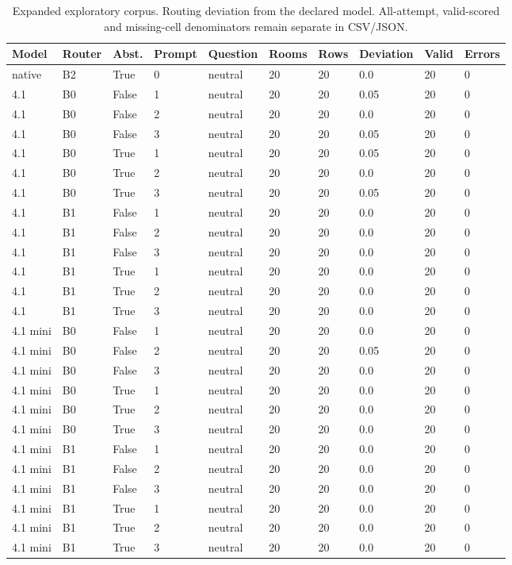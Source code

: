 \begin{table}
\centering
\scriptsize
\caption{Expanded exploratory corpus. Routing deviation from the declared model. All-attempt, valid-scored and missing-cell denominators remain separate in CSV/JSON.}
\begin{tabular}{llllllllll}
\toprule
Model & Router & Abst. & Prompt & Question & Rooms & Rows & Deviation & Valid & Errors \\
\midrule
native & B2 & True & 0 & neutral & 20 & 20 & 0.0 & 20 & 0 \\
4.1 & B0 & False & 1 & neutral & 20 & 20 & 0.05 & 20 & 0 \\
4.1 & B0 & False & 2 & neutral & 20 & 20 & 0.0 & 20 & 0 \\
4.1 & B0 & False & 3 & neutral & 20 & 20 & 0.05 & 20 & 0 \\
4.1 & B0 & True & 1 & neutral & 20 & 20 & 0.05 & 20 & 0 \\
4.1 & B0 & True & 2 & neutral & 20 & 20 & 0.0 & 20 & 0 \\
4.1 & B0 & True & 3 & neutral & 20 & 20 & 0.05 & 20 & 0 \\
4.1 & B1 & False & 1 & neutral & 20 & 20 & 0.0 & 20 & 0 \\
4.1 & B1 & False & 2 & neutral & 20 & 20 & 0.0 & 20 & 0 \\
4.1 & B1 & False & 3 & neutral & 20 & 20 & 0.0 & 20 & 0 \\
4.1 & B1 & True & 1 & neutral & 20 & 20 & 0.0 & 20 & 0 \\
4.1 & B1 & True & 2 & neutral & 20 & 20 & 0.0 & 20 & 0 \\
4.1 & B1 & True & 3 & neutral & 20 & 20 & 0.0 & 20 & 0 \\
4.1 mini & B0 & False & 1 & neutral & 20 & 20 & 0.0 & 20 & 0 \\
4.1 mini & B0 & False & 2 & neutral & 20 & 20 & 0.05 & 20 & 0 \\
4.1 mini & B0 & False & 3 & neutral & 20 & 20 & 0.0 & 20 & 0 \\
4.1 mini & B0 & True & 1 & neutral & 20 & 20 & 0.0 & 20 & 0 \\
4.1 mini & B0 & True & 2 & neutral & 20 & 20 & 0.0 & 20 & 0 \\
4.1 mini & B0 & True & 3 & neutral & 20 & 20 & 0.0 & 20 & 0 \\
4.1 mini & B1 & False & 1 & neutral & 20 & 20 & 0.0 & 20 & 0 \\
4.1 mini & B1 & False & 2 & neutral & 20 & 20 & 0.0 & 20 & 0 \\
4.1 mini & B1 & False & 3 & neutral & 20 & 20 & 0.0 & 20 & 0 \\
4.1 mini & B1 & True & 1 & neutral & 20 & 20 & 0.0 & 20 & 0 \\
4.1 mini & B1 & True & 2 & neutral & 20 & 20 & 0.0 & 20 & 0 \\
4.1 mini & B1 & True & 3 & neutral & 20 & 20 & 0.0 & 20 & 0 \\
\bottomrule
\end{tabular}
\end{table}

